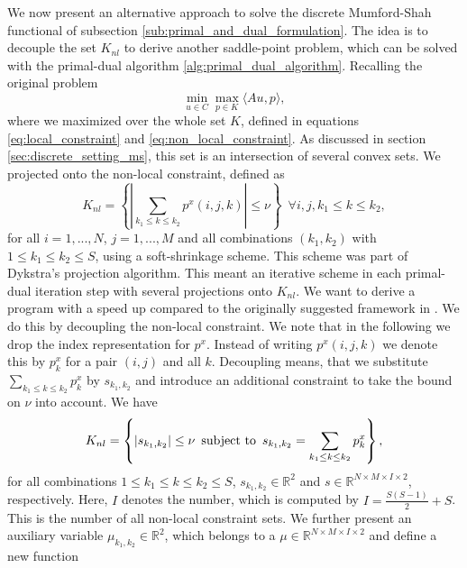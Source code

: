 \documentclass{scrreprt}
\begin{document}
        We now present an alternative approach to solve the discrete Mumford-Shah functional of subsection \ref{sub:primal_and_dual_formulation}. The idea is to decouple the set $K_{nl}$ to derive another saddle-point problem, which can be solved with the primal-dual algorithm \ref{alg:primal_dual_algorithm}. Recalling the original problem
            \begin{equation}
                \min_{u \in C} \max_{p \in K} \langle Au, p \rangle,
                \label{eq:standard_form}
            \end{equation}
        where we maximized over the whole set $K$, defined in equations \ref{eq:local_constraint} and \ref{eq:non_local_constraint}. As discussed in section \ref{sec:discrete_setting_ms}, this set is an intersection of several convex sets. We projected onto the non-local constraint, defined as
            $$
                K_{nl} = \left\{ \left| \sum_{k_{1} \le k \le k_{2}} p^{x}(i, j, k) \right| \le \nu \right\} \,\,\, \forall i, j, k_{1} \le k \le k_{2},
            $$
        for all $i = 1, ..., N$, $j = 1, ..., M$ and all combinations $(k_{1}, k_{2})$ with $1 \le k_{1} \le k_{2} \le S$, using a soft-shrinkage scheme. This scheme was part of Dykstra's projection algorithm. This meant an iterative scheme in each primal-dual iteration step with several projections onto $K_{nl}$. We want to derive a program with a speed up compared to the originally suggested framework in \cite{Pock-et-al-iccv09}. We do this by decoupling the non-local constraint. We note that in the following we drop the index representation for $p^{x}$. Instead of writing $p^{x}(i, j, k)$ we denote this by $p^{x}_{k}$ for a pair $(i,j)$ and all $k$. Decoupling means, that we substitute $\sum\limits_{k_{1} \le k \le k_{2}} p^{x}_{k}$ by $s_{k_{1}, k_{2}}$ and introduce an additional constraint to take the bound on $\nu$ into account. We have
            \begin{equation}
                K_{nl} = \left\{ |s_{k_{1}, k_{2}}| \le \nu \,\,\, \textnormal{subject to} \,\,\, s_{k_{1}, k_{2}} = \sum_{k_{1} \le k \le k_{2}} p^{x}_{k} \right\},
                \label{eq:non_local_constraint_reloaded}
            \end{equation}
        for all combinations $1 \le k_{1} \le k \le k_{2} \le S$, $s_{k_{1}, k_{2}} \in \mathbb{R}^{2}$ and $s \in \mathbb{R}^{N \times M \times I \times 2}$, respectively. Here, $I$ denotes the number, which is computed by $I = \frac{S(S-1)}{2} + S$. This is the number of all non-local constraint sets. We further present an auxiliary variable $\mu_{k_{1}, k_{2}} \in \mathbb{R}^{2}$, which belongs to a $\mu \in \mathbb{R}^{N \times M \times I \times 2}$ and define a new function
\end{document}
